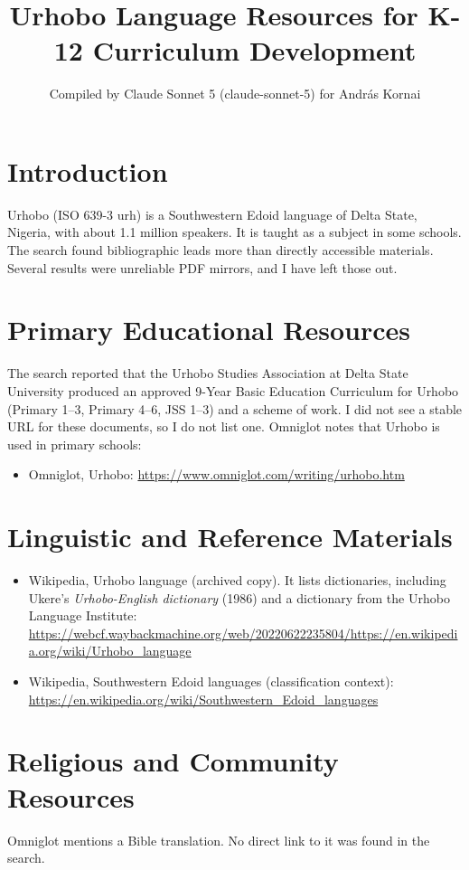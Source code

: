\documentclass[12pt]{article}
\title{Urhobo Language Resources for K-12 Curriculum Development}
\author{Compiled by Claude Sonnet 5 (claude-sonnet-5) for Andr\'as Kornai}
\date{}
\begin{document}
\maketitle

\section{Introduction}
Urhobo (ISO 639-3 urh) is a Southwestern Edoid language of Delta State, Nigeria, with about 1.1 million speakers. It is taught as a subject in some schools. The search found bibliographic leads more than directly accessible materials. Several results were unreliable PDF mirrors, and I have left those out.

\section{Primary Educational Resources}
The search reported that the Urhobo Studies Association at Delta State University produced an approved 9-Year Basic Education Curriculum for Urhobo (Primary 1--3, Primary 4--6, JSS 1--3) and a scheme of work. I did not see a stable URL for these documents, so I do not list one. Omniglot notes that Urhobo is used in primary schools:
\begin{itemize}
\item Omniglot, Urhobo: \url{https://www.omniglot.com/writing/urhobo.htm}
\end{itemize}

\section{Linguistic and Reference Materials}
\begin{itemize}
\item Wikipedia, Urhobo language (archived copy). It lists dictionaries, including Ukere's \emph{Urhobo-English dictionary} (1986) and a dictionary from the Urhobo Language Institute: \url{https://webcf.waybackmachine.org/web/20220622235804/https://en.wikipedia.org/wiki/Urhobo_language}
\item Wikipedia, Southwestern Edoid languages (classification context): \url{https://en.wikipedia.org/wiki/Southwestern_Edoid_languages}
\end{itemize}

\section{Religious and Community Resources}
Omniglot mentions a Bible translation. No direct link to it was found in the search.
\end{document}
